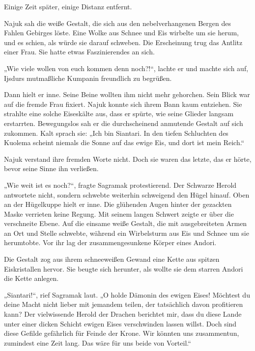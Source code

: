Einige Zeit später, einige Distanz entfernt.\bigskip



Najuk sah die weiße Gestalt, die sich aus den nebelverhangenen Bergen des Fahlen Gebirges löste. Eine Wolke aus Schnee und Eis wirbelte um sie herum, und es schien, als würde sie darauf schweben. Die Erscheinung trug das Antlitz einer Frau. Sie hatte etwas Faszinierendes an sich.

„Wie viele wollen von euch kommen denn noch?!“, lachte er und machte sich auf, Ijsdurs mutmaßliche Kumpanin freundlich zu begrüßen.

Dann hielt er inne. Seine Beine wollten ihm nicht mehr gehorchen. Sein Blick war auf die fremde Frau fixiert. Najuk konnte sich ihrem Bann kaum entziehen. Sie strahlte eine solche Eiseskälte aus, dass er spürte, wie seine Glieder langsam erstarrten. Bewegungslos sah er die durchscheinend anmutende Gestalt auf sich zukommen. Kalt sprach sie: „Ich bin Siantari. In den tiefen Schluchten des Kuolema scheint niemals die Sonne auf das ewige Eis, und dort ist mein Reich.“

Najuk verstand ihre fremden Worte nicht. Doch sie waren das letzte, das er hörte, bevor seine Sinne ihn verließen.



\trennzeichen



„Wie weit ist es noch?“, fragte Sagramak protestierend. Der Schwarze Herold antwortete nicht, sondern schwebte weiterhin schweigend den Hügel hinauf. Oben an der Hügelkuppe hielt er inne. Die glühenden Augen hinter der gezackten Maske verrieten keine Regung. Mit seinem langen Schwert zeigte er über die verschneite Ebene. Auf die einsame weiße Gestalt, die mit ausgebreiteten Armen an Ort und Stelle schwebte, während ein Wirbelsturm aus Eis und Schnee um sie herumtobte. Vor ihr lag der zusammengesunkene Körper eines Andori.

Die Gestalt zog aus ihrem schneeweißen Gewand eine Kette aus spitzen Eiskristallen hervor. Sie beugte sich herunter, als wollte sie dem starren Andori die Kette anlegen.

„Siantari!“, rief Sagramak laut. „O holde Dämonin des ewigen Eises! Möchtest du deine Macht nicht lieber mit jemandem teilen, der tatsächlich davon profitieren kann? Der vielwissende Herold der Drachen berichtet mir, dass du diese Lande unter einer dicken Schicht ewigen Eises verschwinden lassen willst. Doch sind diese Gefilde gefährlich für Feinde der Krone. Wir könnten uns zusammentun, zumindest eine Zeit lang. Das wäre für uns beide von Vorteil.“

